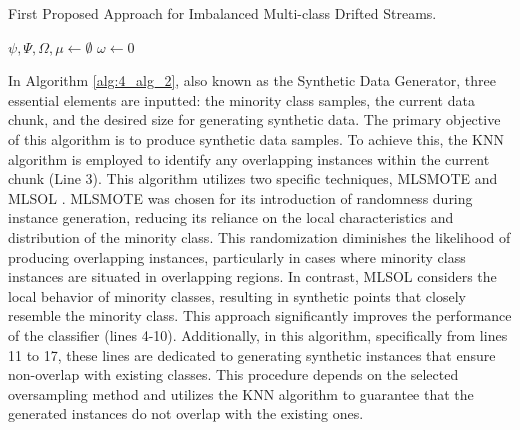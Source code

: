\begin{algorithm}[H]
\caption{First Proposed Approach for Imbalanced Multi-class Drifted Streams.}
\label{alg:4_alg_1}
\BlankLine
$\psi, \Psi, \Omega, \mu \gets \emptyset$\;
$\omega \gets 0$\;
\end{algorithm}

\vspace{1cm}

In Algorithm \ref{alg:4_alg_2}, also known as the Synthetic Data Generator, three essential elements are inputted: the minority class samples, the current data chunk, and the desired size for generating synthetic data. The primary objective of this algorithm is to produce synthetic data samples. To achieve this, the KNN algorithm is employed to identify any overlapping instances within the current chunk (Line 3). This algorithm utilizes two specific techniques, MLSMOTE \cite{gama2004learning} and MLSOL \cite{liu2017regional}. MLSMOTE was chosen for its introduction of randomness during instance generation, reducing its reliance on the local characteristics and distribution of the minority class. This randomization diminishes the likelihood of producing overlapping instances, particularly in cases where minority class instances are situated in overlapping regions. In contrast, MLSOL considers the local behavior of minority classes, resulting in synthetic points that closely resemble the minority class. This approach significantly improves the performance of the classifier (lines 4-10). Additionally, in this algorithm, specifically from lines 11 to 17, these lines are dedicated to generating synthetic instances that ensure non-overlap with existing classes. This procedure depends on the selected oversampling method and utilizes the KNN algorithm to guarantee that the generated instances do not overlap with the existing ones.
\vspace{1cm}

